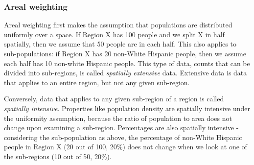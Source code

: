 \documentclass[12pt,twoside]{reedthesis}
\theoremstyle{definition}
\theoremstyle{definition}
\theoremstyle{definition}
\theoremstyle{remark}
\begin{document}
\hypertarget{areal-weighting}{%
\subsubsection{Areal weighting}\label{areal-weighting}}

Areal weighting first makes the assumption that populations are
distributed uniformly over a space. If Region X has 100 people and we
split X in half spatially, then we assume that 50 people are in each
half. This also applies to sub-populations: if Region X has 20 non-White
Hispanic people, then we assume each half has 10 non-white Hispanic
people. This type of data, counts that can be divided into sub-regions,
is called \emph{spatially extensive} data. Extensive data is data that
applies to an entire region, but not any given sub-region.

Conversely, data that applies to any given sub-region of a region is
called \emph{spatially intensive}. Properties like population density
are spatially intensive under the uniformity assumption, because the
ratio of population to area does not change upon examining a sub-region.
Percentages are also spatially intensive - considering the
sub-population as above, the percentage of non-White Hispanic people in
Region X (20 out of 100, 20\%) does not change when we look at one of
the sub-regions (10 out of 50, 20\%).
\end{document}
